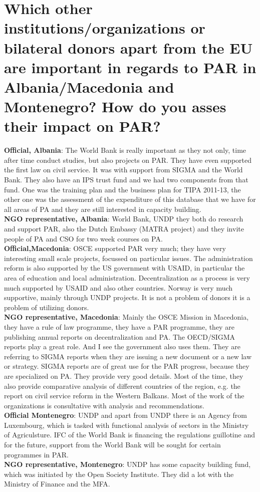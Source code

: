 \section{ Which other institutions/organizations or bilateral donors apart from the EU are important in regards to PAR in Albania/Macedonia and Montenegro? How do you asses their impact on PAR? }
\textbf{Official, Albania}: The World Bank is really important as they not only, time after time conduct studies, but also projects on PAR. They have even supported the first law on civil service. It was with support from SIGMA and the World Bank. They also have an IPS trust fund and we had two components from that fund. One was the training plan and the business plan for TIPA 2011-13, the other one was the assessment of the expenditure of this database that we have for all areas of PA and they are still interested in capacity building. \\
\textbf{NGO representative, Albania}: World Bank, UNDP they both do research and support PAR, also the Dutch Embassy (MATRA project) and they invite people of PA and CSO for two week courses on PA.\\
\textbf{Official,Macedonia}: OSCE supported PAR very much; they have very interesting small scale projects, focussed on particular issues. The administration reform is also supported by the US government with USAID, in particular the area of education and local administration. Decentralization as a process is very much supported by USAID and also other countries. Norway is very much supportive, mainly through UNDP projects. It is not a problem of donors it is a problem of utilizing donors.  \\
\textbf{NGO representative, Macedonia}: Mainly the OSCE Mission in Macedonia, they have a rule of law programme, they have a PAR programme, they are publishing annual reports on decentralization and PA. The OECD/SIGMA reports play a great role. And I see the government also uses them. They are referring to SIGMA reports when they are issuing a new document or a new law or strategy. SIGMA reports are of great use for the PAR progress, because they are specialized on PA. They provide very good details. Most of the time, they also provide comparative analysis of different countries of the region, e.g. the report on civil service reform in the Western Balkans. Most of the work of the organizations is consultative with analysis and recommendations. \\
\textbf{Official Montenegro}: UNDP and apart from UNDP there is an Agency from Luxembourg, which is tasked with functional analysis of sectors in the Ministry of Agriculsture. IFC of the World Bank is financing the regulations guillotine and for the future, support from the World Bank will be sought for certain programmes in PAR. \\
\textbf{NGO representative, Montenegro}: UNDP has some capacity building fund, which was initiated by the Open Society Institute. They did a lot with the Ministry of Finance and the MFA.%
